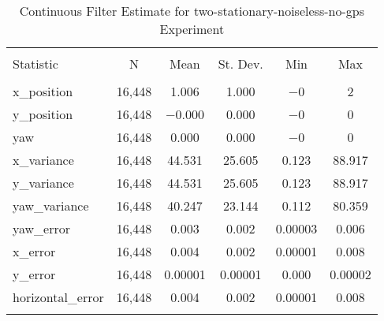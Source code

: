 
\begin{table}[h] \centering 
  \caption{Continuous Filter Estimate for two-stationary-noiseless-no-gps Experiment} 
  \label{tab:two_stationary_noiseless_no_gps_continuous_summary} 
\begin{tabular}{@{\extracolsep{5pt}}lccccc} 
\\[-1.8ex]\hline 
\hline \\[-1.8ex] 
Statistic & \multicolumn{1}{c}{N} & \multicolumn{1}{c}{Mean} & \multicolumn{1}{c}{St. Dev.} & \multicolumn{1}{c}{Min} & \multicolumn{1}{c}{Max} \\ 
\hline \\[-1.8ex] 
x\_position & 16,448 & 1.006 & 1.000 & $-$0 & 2 \\ 
y\_position & 16,448 & $-$0.000 & 0.000 & $-$0 & 0 \\ 
yaw & 16,448 & 0.000 & 0.000 & $-$0 & 0 \\ 
x\_variance & 16,448 & 44.531 & 25.605 & 0.123 & 88.917 \\ 
y\_variance & 16,448 & 44.531 & 25.605 & 0.123 & 88.917 \\ 
yaw\_variance & 16,448 & 40.247 & 23.144 & 0.112 & 80.359 \\ 
yaw\_error & 16,448 & 0.003 & 0.002 & 0.00003 & 0.006 \\ 
x\_error & 16,448 & 0.004 & 0.002 & 0.00001 & 0.008 \\ 
y\_error & 16,448 & 0.00001 & 0.00001 & 0.000 & 0.00002 \\ 
horizontal\_error & 16,448 & 0.004 & 0.002 & 0.00001 & 0.008 \\ 
\hline \\[-1.8ex] 
\end{tabular} 
\end{table} 
